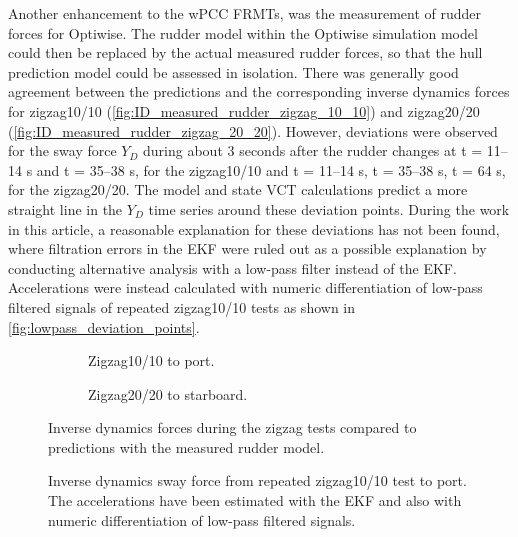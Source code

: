Another enhancement to the wPCC FRMTs, was the measurement of rudder forces for Optiwise.
The rudder model within the Optiwise simulation model could then be replaced by the actual measured rudder forces, so that the hull prediction model could be assessed in isolation. There was generally good agreement between the predictions and the corresponding inverse dynamics forces for zigzag10/10 (\autoref{fig:ID_measured_rudder_zigzag_10_10}) and zigzag20/20 (\autoref{fig:ID_measured_rudder_zigzag_20_20}).
However, deviations were observed for the sway force $Y_D$ during about 3 seconds after the rudder changes at t = 11--14 s and t = 35--38 s, for the zigzag10/10 and t = 11--14 s, t = 35--38 s, t = 64 s, for the zigzag20/20. The model and state VCT calculations predict a more straight line in the $Y_D$ time series around these deviation points. 
During the work in this article, a reasonable explanation for these deviations has not been found, where filtration errors in the EKF were ruled out as a possible explanation by conducting alternative analysis with a low-pass filter instead of the EKF. Accelerations were instead calculated with numeric differentiation of low-pass filtered signals of repeated zigzag10/10 tests as shown in \autoref{fig:lowpass_deviation_points}.
\begin{figure}[h]
    \centering
    \begin{subfigure}[b]{\textwidth}
        \centering
        
        \caption{Zigzag10/10 to port.}
        \label{fig:ID_measured_rudder_zigzag_10_10}
    \end{subfigure}
     \vfill
    \begin{subfigure}[b]{\textwidth}
        \centering
        
        \caption{Zigzag20/20 to starboard.}
        \label{fig:ID_measured_rudder_zigzag_20_20}
    \end{subfigure}
    \caption{Inverse dynamics forces during the zigzag tests compared to predictions with the measured rudder model.}
    \label{fig:ID_optiwise20}
\end{figure}
\begin{figure}[h]
    \centering
    
    \caption{Inverse dynamics sway force from repeated zigzag10/10 test to port. The accelerations have been estimated with the EKF and also with numeric differentiation of low-pass filtered signals.}
    \label{fig:lowpass_deviation_points}
\end{figure}
\FloatBarrier

